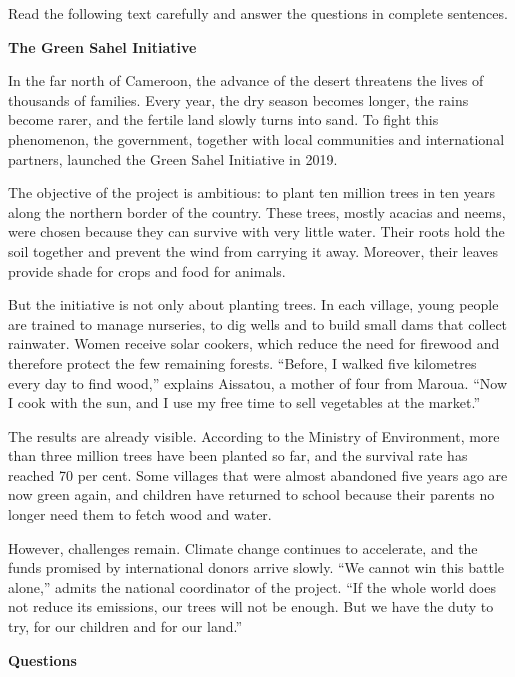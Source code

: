 \documentclass[11pt]{article}
\begin{document}
\begin{exercice}
Read the following text carefully and answer the questions in complete sentences.

\textbf{The Green Sahel Initiative}

In the far north of Cameroon, the advance of the desert threatens the lives of thousands of families. Every year, the dry season becomes longer, the rains become rarer, and the fertile land slowly turns into sand. To fight this phenomenon, the government, together with local communities and international partners, launched the Green Sahel Initiative in 2019.

The objective of the project is ambitious: to plant ten million trees in ten years along the northern border of the country. These trees, mostly acacias and neems, were chosen because they can survive with very little water. Their roots hold the soil together and prevent the wind from carrying it away. Moreover, their leaves provide shade for crops and food for animals.

But the initiative is not only about planting trees. In each village, young people are trained to manage nurseries, to dig wells and to build small dams that collect rainwater. Women receive solar cookers, which reduce the need for firewood and therefore protect the few remaining forests. ``Before, I walked five kilometres every day to find wood,'' explains Aissatou, a mother of four from Maroua. ``Now I cook with the sun, and I use my free time to sell vegetables at the market.''

The results are already visible. According to the Ministry of Environment, more than three million trees have been planted so far, and the survival rate has reached 70 per cent. Some villages that were almost abandoned five years ago are now green again, and children have returned to school because their parents no longer need them to fetch wood and water.

However, challenges remain. Climate change continues to accelerate, and the funds promised by international donors arrive slowly. ``We cannot win this battle alone,'' admits the national coordinator of the project. ``If the whole world does not reduce its emissions, our trees will not be enough. But we have the duty to try, for our children and for our land.''

\textbf{Questions}


\end{exercice}
\end{document}
